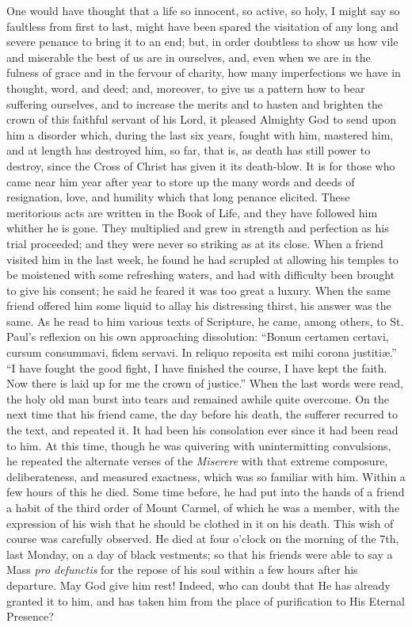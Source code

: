 One would have thought that a life so innocent, so
active, so holy, I might say so faultless from first to
last, might have been spared the visitation of any long
and severe penance to bring it to an end; but, in order
doubtless to show us how vile and miserable the best of
us are in ourselves, and, even when we are in the fulness
of grace and in the fervour of charity, how many
imperfections we have in thought, word, and deed; and,
moreover, to give us a pattern how to bear suffering
ourselves, and to increase the merits and to hasten and
brighten the crown of this faithful servant of his Lord,
it pleased Almighty God to send upon him a disorder
which, during the last six years, fought with him,
mastered him, and at length has destroyed him, so far,
that is, as death has still power to destroy, since the
Cross of Christ has given it its death-blow. It is for
those who came near him year after year to store up the
many words and deeds of resignation, love, and humility
which that long penance elicited. These meritorious acts
are written in the Book of Life, and they have followed
him whither he is gone. They multiplied and grew in
strength and perfection as his trial proceeded; and they
were never so striking as at its close. When a friend
visited him in the last week, he found he had scrupled at
allowing his temples to be moistened with some refreshing
waters, and had with difficulty been brought to give his
consent; he said he feared it was too great a luxury.
When the same friend offered him some liquid to allay his
distressing thirst, his answer was the same. As he read
to him various texts of Scripture, he came, among others,
to St. Paul's reflexion on his own approaching
dissolution: ``Bonum certamen certavi, cursum
consummavi, fidem servavi. In reliquo reposita est mihi
corona justitiæ.'' ``I have fought the good
fight, I have finished the course, I have kept the faith.
Now there is laid up for me the crown of justice.''
When the last words were read, the holy old man burst
into tears and remained awhile quite overcome. On the
next time that his friend came, the day before his death,
the sufferer recurred to the text, and repeated it. It
had been his consolation ever since it had been read to
him. At this time, though he was quivering with
unintermitting convulsions, he repeated the alternate
verses of the \emph{Miserere} with that extreme
composure, deliberateness, and measured exactness, which
was so familiar with him. Within a few hours of this he
died. Some time before, he had put into the hands of a
friend a habit of the third order of Mount Carmel, of
which he was a member, with the expression of his wish
that he should be clothed in it on his death. This wish
of course was carefully observed. He died at four o'clock
on the morning of the 7th, last Monday, on a day of black
vestments; so that his friends were able to say a Mass \emph{pro
defunctis} for the repose of his soul within a few
hours after his departure. May God give him rest! Indeed,
who can doubt that He has already granted it to him, and
has taken him from the place of purification to His
Eternal Presence?

